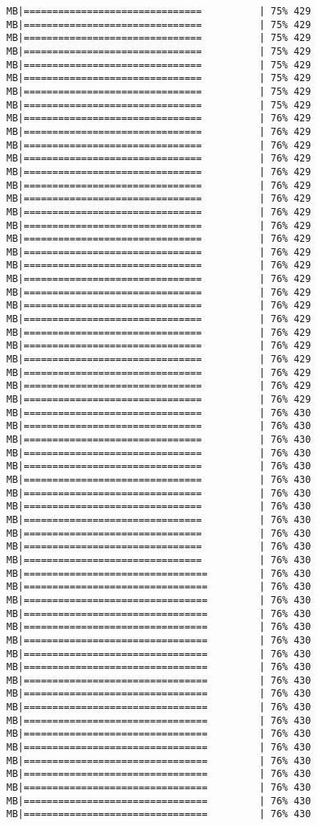 \documentclass[
]{article}
\begin{document}
\begin{verbatim}
MB|===============================          | 75% 429 MB|===============================          | 75% 429 MB|===============================          | 75% 429 MB|===============================          | 75% 429 MB|===============================          | 75% 429 MB|===============================          | 75% 429 MB|===============================          | 75% 429 MB|===============================          | 75% 429 MB|===============================          | 76% 429 MB|===============================          | 76% 429 MB|===============================          | 76% 429 MB|===============================          | 76% 429 MB|===============================          | 76% 429 MB|===============================          | 76% 429 MB|===============================          | 76% 429 MB|===============================          | 76% 429 MB|===============================          | 76% 429 MB|===============================          | 76% 429 MB|===============================          | 76% 429 MB|===============================          | 76% 429 MB|===============================          | 76% 429 MB|===============================          | 76% 429 MB|===============================          | 76% 429 MB|===============================          | 76% 429 MB|===============================          | 76% 429 MB|===============================          | 76% 429 MB|===============================          | 76% 429 MB|===============================          | 76% 429 MB|===============================          | 76% 429 MB|===============================          | 76% 429 MB|===============================          | 76% 430 MB|===============================          | 76% 430 MB|===============================          | 76% 430 MB|===============================          | 76% 430 MB|===============================          | 76% 430 MB|===============================          | 76% 430 MB|===============================          | 76% 430 MB|===============================          | 76% 430 MB|===============================          | 76% 430 MB|===============================          | 76% 430 MB|===============================          | 76% 430 MB|===============================          | 76% 430 MB|================================         | 76% 430 MB|================================         | 76% 430 MB|================================         | 76% 430 MB|================================         | 76% 430 MB|================================         | 76% 430 MB|================================         | 76% 430 MB|================================         | 76% 430 MB|================================         | 76% 430 MB|================================         | 76% 430 MB|================================         | 76% 430 MB|================================         | 76% 430 MB|================================         | 76% 430 MB|================================         | 76% 430 MB|================================         | 76% 430 MB|================================         | 76% 430 MB|================================         | 76% 430 MB|================================         | 76% 430 MB|================================         | 76% 430 MB|================================         | 76% 430 
\end{verbatim}
\end{document}
